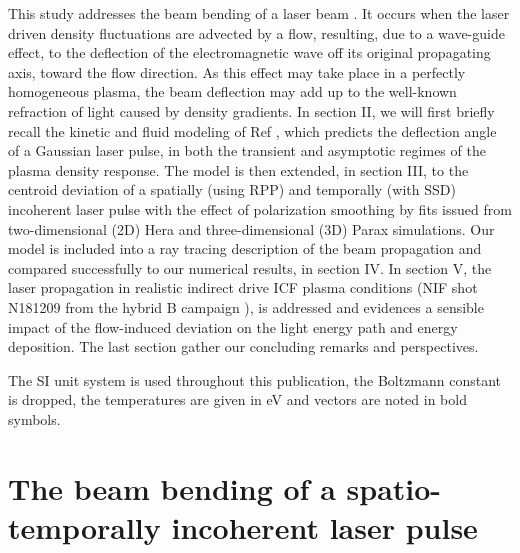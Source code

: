 \documentclass[%
 reprint,
 amsmath,amssymb,
 aps,
]{revtex4-1}
\begin{document}
This study  addresses the beam bending  of  a laser beam \cite{POP_Hinkel_1998,POP_Bezzerides_1998,POP_Rose_96,PRL_Montgomery}.
It occurs when the laser driven density fluctuations are advected by a flow, resulting,  due to a wave-guide effect, to the deflection of the electromagnetic wave off its original propagating axis, toward the flow direction. 
As this effect may take place in a perfectly homogeneous plasma, the beam deflection may add up to the well-known refraction of light caused by density gradients. 
In section II, we will first briefly recall the kinetic and fluid  modeling of Ref \cite[]{POP_Ruyer_2020}, which predicts the deflection angle of a Gaussian laser pulse, in both the transient and asymptotic regimes of the plasma density response.
The model is then extended, in section III, to the centroid deviation of a spatially (using RPP) and temporally (with SSD) incoherent laser pulse with the effect of polarization smoothing by fits issued from two-dimensional (2D) Hera \cite{HERA_Jourdren_2005,Loiseau_2006} and three-dimensional (3D) Parax \cite[]{POP_Riazuelo_2000} simulations.  
Our model  is included into 
a  ray tracing description of the beam propagation and compared successfully to  our numerical results, in section IV. 
%
In section V, the laser propagation in realistic indirect drive ICF plasma conditions (NIF shot N181209 from the hybrid B campaign \cite[]{POP_Hurricane_2019,POP_Kritcher_2020,POP_Zylstra_2020,POP_Hohenberger_2020}), is addressed and evidences a sensible impact of the flow-induced deviation on the light energy path and energy deposition. 
%
The last section gather our concluding remarks and perspectives. 

The SI unit system is used throughout this publication, the Boltzmann constant is dropped, the temperatures are given in eV and vectors are noted in bold symbols. 

\section{The beam bending of a spatio-temporally incoherent laser pulse}\label{sec:gauss}
\end{document}
